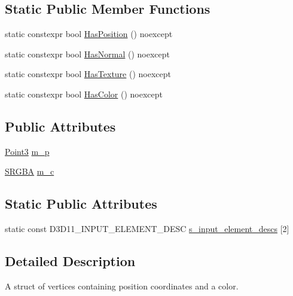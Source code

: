 \subsection*{Static Public Member Functions}
\begin{DoxyCompactItemize}
\item 
static constexpr bool \hyperlink{structmage_1_1rendering_1_1_vertex_position_color_a9a905a75c75030b37575a7b65dff61b0}{Has\+Position} () noexcept
\item 
static constexpr bool \hyperlink{structmage_1_1rendering_1_1_vertex_position_color_a95f2749a6f879b4123034a78c504f3c5}{Has\+Normal} () noexcept
\item 
static constexpr bool \hyperlink{structmage_1_1rendering_1_1_vertex_position_color_a1498641d42122251a8612b7b40d171da}{Has\+Texture} () noexcept
\item 
static constexpr bool \hyperlink{structmage_1_1rendering_1_1_vertex_position_color_aea75d3acadad3cd6da04d0fc2207fc0c}{Has\+Color} () noexcept
\end{DoxyCompactItemize}
\subsection*{Public Attributes}
\begin{DoxyCompactItemize}
\item 
\hyperlink{structmage_1_1_point3}{Point3} \hyperlink{structmage_1_1rendering_1_1_vertex_position_color_a2c1c6a22bff4eca8cee086cc978d008b}{m\+\_\+p}
\item 
\hyperlink{structmage_1_1_s_r_g_b_a}{S\+R\+G\+BA} \hyperlink{structmage_1_1rendering_1_1_vertex_position_color_ac4aa1eea0e3e24411a57670550822198}{m\+\_\+c}
\end{DoxyCompactItemize}
\subsection*{Static Public Attributes}
\begin{DoxyCompactItemize}
\item 
static const D3\+D11\+\_\+\+I\+N\+P\+U\+T\+\_\+\+E\+L\+E\+M\+E\+N\+T\+\_\+\+D\+E\+SC \hyperlink{structmage_1_1rendering_1_1_vertex_position_color_a0e9bd3e8e7cad0a5167aaeb76de9fbb3}{s\+\_\+input\+\_\+element\+\_\+descs} \mbox{[}2\mbox{]}
\end{DoxyCompactItemize}


\subsection{Detailed Description}
A struct of vertices containing position coordinates and a color. 

